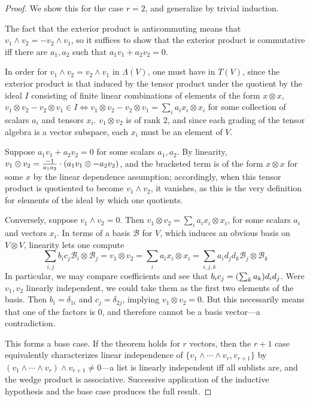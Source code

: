 \documentclass{article}
\begin{document}
\begin{proof}
  We show this for the case $r = 2$, and generalize by trivial induction.

  The fact that the exterior product is anticommuting means that $v_{1} \land v_{2} = - v_{2} \land v_{1}$,
  so it suffices to show that the exterior product is commutative iff there are $a_{1}, a_{2}$ such that $a_{1}v_{1} + a_{2}v_{2} = 0$.

  In order for $v_{1} \wedge v_{2} = v_{2} \wedge v_{1}$ in $\Lambda(V)$,
  one must have in $T(V)$, since the exterior product is that induced by the tensor product under the quotient by the ideal $I$ consisting of
  finite linear combinations of elements of the form $x \otimes x$,
  $v_{1} \otimes v_{2} - v_{2} \otimes v_{1} \in I \Leftrightarrow v_{1} \otimes v_{2} - v_{2} \otimes v_{1} = \sum_{i}a_{i}x_{i} \otimes x_{i}$
  for some collection of scalars $a_{i}$ and tensors $x_{i}$.
  $v_{1} \otimes v_{2}$ is of rank 2, and since each grading of the tensor algebra is a vector subspace, each $x_{i}$ must be an element of $V$.

  Suppose $a_{1}v_{1} + a_{2}v_{2} = 0$ for some scalars $a_{1}, a_{2}$.
  By linearity, $v_{1} \otimes v_{2} = \frac{-1}{a_{1}a_{2}} \cdot \qty(a_{1}v_{1}\otimes -a_{2}v_{2})$, and the bracketed term is of the form
  $x \otimes x$ for some $x$ by the linear dependence assumption; accordingly, when this tensor product is quotiented
  to become $v_{1} \wedge v_{2}$, it vanishes, as this is the very definition for elements of the ideal by which one quotients.

  Conversely, suppose $v_{1} \wedge v_{2} = 0$.
  Then $v_{1} \otimes v_{2} = \sum_{i}a_{i}x_{i} \otimes x_{i}$, for some scalars $a_{i}$ and vectors $x_{i}$.
  In terms of a basis $\mathcal{B}$ for $V$, which induces an obvious basis on $V \otimes V$, linearity lets one compute
  \[
    \sum_{i, j}b_{i}c_{j} \mathcal{B}_{i} \otimes \mathcal{B}_{j} = v_{1} \otimes v_{2} = \sum_{i}a_{i}x_{i} \otimes x_{i}
    = \sum_{i,j,k}a_{i}d_{j}d_{k}\mathcal{B}_{j} \otimes \mathcal{B}_{k}
  \]
  In particular, we may compare coefficients and see that $b_{i}c_{j} = \qty(\sum_{k}a_{k})d_{i}d_{j}$.
  Were $v_{1}, v_{2}$ linearly independent, we could take them as the first two elements of the basis.
  Then $b_{i} = \delta_{1i}$ and $c_{j} = \delta_{2j}$, implying $v_{1} \otimes v_{2} = 0$.
  But this necessarily means that one of the factors is 0, and therefore cannot be a basis vector---a contradiction.


  This forms a base case.
  If the theorem holds for $r$ vectors, then the $r+1$ case equivalently characterizes linear independence of
  $\{v_{1} \wedge \cdots \wedge v_{r}, v_{r+1}\}$ by $(v_{1} \wedge \cdots \wedge v_{r}) \wedge v_{r+1} \neq 0$---a list is linearly independent
  iff all sublists are, and the wedge product is associative.
  Successive application of the inductive hypothesis and the base case produces the full result.
\end{proof}
\end{document}
